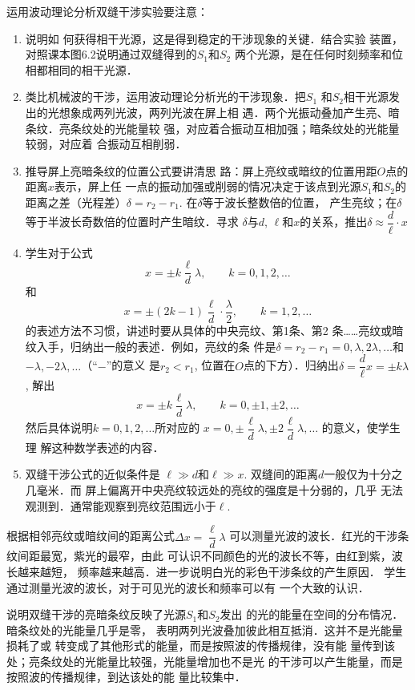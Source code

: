 运用波动理论分析双缝干涉实验要注意：
\begin{enumerate}
\item 说明如
何获得相干光源，这是得到稳定的干涉现象的关键．结合实验
装置，对照课本图6.2说明通过双缝得到的$S_1$和$S_2$
两个光源，是在任何时刻频率和位相都相同的相干光源．
\item 
类比机械波的干涉，运用波动理论分析光的干涉现象．把$S_1$
和$S_2$相干光源发出的光想象成两列光波，两列光波在屏上相
遇．两个光振动叠加产生亮、暗条纹．亮条纹处的光能量较
强，对应着合振动互相加强；暗条纹处的光能量较弱，对应着
合振动互相削弱．
\item 推导屏上亮暗条纹的位置公式要讲清思
路：屏上亮纹或暗纹的位置用距$O$点的距离$x$表示，屏上任
一点的振动加强或削弱的情况决定于该点到光源$S_1$和$S_2$的
距离之差（光程差）$\delta=r_2-r_1$. 在$\delta$等于波长整数倍的位置，
产生亮纹；在$\delta$等于半波长奇数倍的位置时产生暗纹．寻求
$\delta$与$d$, $\ell$和$x$的关系，推出$\delta\approx \dfrac{d}{\ell}\cdot x$
\item 学生对于公式
\[x=\pm k\frac{\ell }{d}\lambda, \qquad k=0,1,2,\ldots\]
和
\[x=\pm (2k-1)\frac{\ell }{d}\cdot \frac{\lambda}{2}, \qquad k=1,2,\ldots\]
的表述方法不习惯，讲述时要从具体的中央亮纹、第1条、第2
条……亮纹或暗纹入手，归纳出一般的表述．例如，亮纹的条
件是$\delta=r_2-r_1=0,\lambda,2\lambda,\ldots$和$-\lambda,-2\lambda,\ldots$（“$-$”的意义
是$r_2<r_1$, 位置在$O$点的下方）．归纳出$\delta=\dfrac{d}{\ell}x=\pm k\lambda$, 解出
\[x=\pm k\frac{\ell }{d}\lambda, \qquad k=0,\pm 1,\pm 2,\ldots\]
然后具体说明$k=0,1,
2,\ldots$所对应的
$x=0,\pm\dfrac{\ell}{d}\lambda,\pm 2\dfrac{\ell}{d}\lambda,\ldots$
的意义，使学生理
解这种数学表述的内容．
\item 双缝干涉公式的近似条件是
$\ell\gg d$和$\ell\gg x$. 双缝间的距离$d$一般仅为十分之几毫米．而
屏上偏离开中央亮纹较远处的亮纹的强度是十分弱的，几乎
无法观测到．通常能观察到亮纹范围远小于$\ell$.
\end{enumerate}


根据相邻亮纹或暗纹间的距离公式$\Delta x=\dfrac{\ell}{d}\lambda$
可以测量光波的波长．红光的干涉条纹间距最宽，紫光的最窄，由此
可认识不同颜色的光的波长不等，由红到紫，波长越来越短，
频率越来越高．进一步说明白光的彩色干涉条纹的产生原因．
学生通过测量光波的波长，对于可见光的波长和频率可以有
一个大致的认识．

说明双缝干涉的亮暗条纹反映了光源$S_1$和$S_2$发出
的光的能量在空间的分布情况．暗条纹处的光能量几乎是零，
表明两列光波叠加彼此相互抵消．这并不是光能量损耗了或
转变成了其他形式的能量，而是按照波的传播规律，没有能
量传到该处；亮条纹处的光能量比较强，光能量增加也不是光
的干涉可以产生能量，而是按照波的传播规律，到达该处的能
量比较集中．

